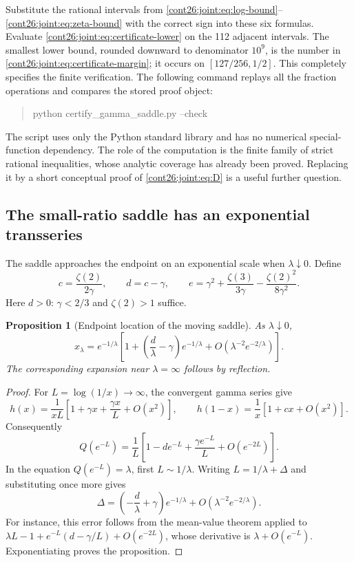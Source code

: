 \documentclass[11pt,letterpaper]{article}
\numberwithin{equation}{section}
\theoremstyle{plain}
\newtheorem{proposition}[theorem]{Proposition}
\theoremstyle{definition}
\theoremstyle{remark}
\begin{document}
Substitute the rational intervals from
\eqref{cont26:joint:eq:log-bound}--\eqref{cont26:joint:eq:zeta-bound} with the correct
sign into these six formulas.  Evaluate
\eqref{cont26:joint:eq:certificate-lower} on the 112 adjacent intervals.
The smallest lower bound, rounded downward to denominator $10^9$,
is the number in \eqref{cont26:joint:eq:certificate-margin}; it occurs on
$[127/256,1/2]$.  This completely specifies the finite verification.
The following command replays all the fraction operations and compares
the stored proof object:
\begin{quote}\ttfamily
 python certify\_gamma\_saddle.py --check
\end{quote}
The script uses only the Python standard library and has no numerical
special-function dependency.  The role of the computation is the
finite family of strict rational inequalities, whose analytic coverage
has already been proved.  Replacing it by a short conceptual proof of
\eqref{cont26:joint:eq:D} is a useful further question.

\subsection{The small-ratio saddle has an exponential transseries}

The saddle approaches the endpoint on an exponential scale when
$\lambda\downarrow0$.  Define
\begin{equation}\label{cont26:joint:eq:cde}
 c=\frac{\zeta(2)}{2\gamma},\qquad d=c-\gamma,\qquad
 e=\gamma^2+\frac{\zeta(3)}{3\gamma}
                   -\frac{\zeta(2)^2}{8\gamma^2}.
\end{equation}
Here $d>0$: $\gamma<2/3$ and $\zeta(2)>1$ suffice.

\begin{proposition}[Endpoint location of the moving saddle]
\label{cont26:joint:prop:saddle-small}
As $\lambda\downarrow0$,
\begin{equation}\label{cont26:joint:eq:saddle-small}
 x_\lambda=e^{-1/\lambda}
 \left[1+\left(\frac d\lambda-\gamma\right)e^{-1/\lambda}
 +O\left(\lambda^{-2}e^{-2/\lambda}\right)\right].
\end{equation}
The corresponding expansion near $\lambda=\infty$ follows by reflection.
\end{proposition}
\begin{proof}
For $L=\log(1/x)\to\infty$, the convergent gamma series give
\[
 h(x)=\frac1{xL}\left[1+\gamma x+\frac{\gamma x}L+O(x^2)\right],
 \qquad h(1-x)=\frac1x[1+cx+O(x^2)].
\]
Consequently
\[
 Q(e^{-L})=\frac1L\left[1-de^{-L}
                      +\frac{\gamma e^{-L}}L+O(e^{-2L})\right].
\]
In the equation $Q(e^{-L})=\lambda$, first $L\sim1/\lambda$.
Writing $L=1/\lambda+\Delta$ and substituting once more gives
\[
 \Delta=\left(-\frac d\lambda+\gamma\right)e^{-1/\lambda}
          +O(\lambda^{-2}e^{-2/\lambda}).
\]
For instance, this error follows from the mean-value theorem applied
to $\lambda L-1+e^{-L}(d-\gamma/L)+O(e^{-2L})$, whose derivative
is $\lambda+O(e^{-L})$.  Exponentiating proves the proposition.
\end{proof}
\end{document}
